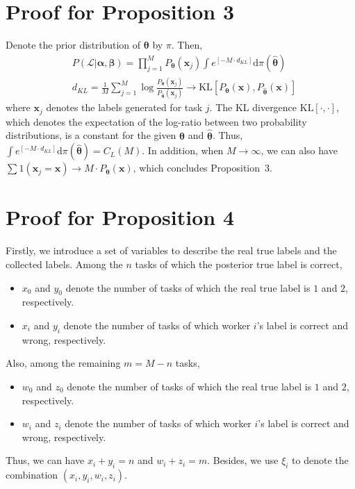 \documentclass{article}
\begin{document}
\section{Proof for Proposition 3}
Denote the prior distribution of $\bm{\theta}$ by $\pi$. Then,
\begin{align}
&P(\mathcal{L}|\bm{\alpha}, \bm{\beta})= {\prod}_{j=1}^{M}P_{\bm{\theta}}(\bm{x}_j) \int e^{[-M\cdot d_{KL}]} \mathrm{d}\pi(\hat{\bm{\theta}})\\
&d_{KL}=\frac{1}{M}\sum_{j=1}^{M}\log \frac{P_{\bm{\theta}}(\bm{x}_j)}{P_{\bm{\hat{\theta}}}(\bm{x}_j)}\rightarrow \mathrm{KL}[P_{\bm{\theta}}(\bm{x}),P_{\bm{\hat{\theta}}}(\bm{x})]
\end{align}
where $\bm{x}_j$ denotes the labels generated for task $j$. The KL divergence $\mathrm{KL}[\cdot, \cdot]$, which denotes the expectation of the log-ratio between two probability distributions, is a constant for the given $\bm{\theta}$ and $\hat{\bm{\theta}}$.
Thus, $\int e^{[-M\cdot d_{KL}]} \mathrm{d}\pi(\hat{\bm{\theta}})=C_{L}(M)$.
In addition, when $M\rightarrow \infty$, we can also have $\sum 1(\bm{x}_j=\bm{x})\rightarrow M \cdot P_{\bm{\theta}}(\bm{x})$, which concludes Proposition~3.

\section{Proof for Proposition 4}
Firstly, we introduce a set of variables to describe the real true labels and the collected labels.
Among the $n$ tasks of which the posterior true label is correct,
\begin{itemize}[noitemsep,topsep=0pt]
\item $x_0$ and $y_0$ denote the number of tasks of which the real true label is $1$ and $2$, respectively.
\item $x_i$ and $y_i$ denote the number of tasks of which worker $i$'s label is correct and wrong, respectively.
\end{itemize}
Also, among the remaining $m=M-n$ tasks, 
\begin{itemize}[noitemsep,topsep=0pt]
\item $w_0$ and $z_0$ denote the number of tasks of which the real true label is $1$ and $2$, respectively.
\item $w_i$ and $z_i$ denote the number of tasks of which worker $i$'s label is correct and wrong, respectively.
\end{itemize}
Thus, we can have $x_i+y_i=n$ and $w_i+z_i=m$. Besides, we use $\xi_i$ to denote the combination $(x_i,y_i,w_i, z_i)$.
\end{document}

